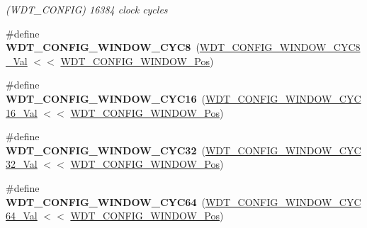 \begin{DoxyCompactItemize}
\begin{DoxyCompactList}\small\item\em (W\+D\+T\+\_\+\+C\+O\+N\+F\+I\+G) 16384 clock cycles \end{DoxyCompactList}\item 
\hypertarget{group___s_a_m_l21___w_d_t_ga017c5c86caead59c9eaa42c32219d348}{}\#define {\bfseries W\+D\+T\+\_\+\+C\+O\+N\+F\+I\+G\+\_\+\+W\+I\+N\+D\+O\+W\+\_\+\+C\+Y\+C8}~(\hyperlink{group___s_a_m_l21___w_d_t_ga6c3961932249ae130fcfba2c4a7eb4d5}{W\+D\+T\+\_\+\+C\+O\+N\+F\+I\+G\+\_\+\+W\+I\+N\+D\+O\+W\+\_\+\+C\+Y\+C8\+\_\+\+Val}    $<$$<$ \hyperlink{group___s_a_m_l21___w_d_t_gab2d3263bd9ad06e3257234d9da623ef8}{W\+D\+T\+\_\+\+C\+O\+N\+F\+I\+G\+\_\+\+W\+I\+N\+D\+O\+W\+\_\+\+Pos})\label{group___s_a_m_l21___w_d_t_ga017c5c86caead59c9eaa42c32219d348}

\item 
\hypertarget{group___s_a_m_l21___w_d_t_ga914e9688e4e761a07f9e692bea93bad5}{}\#define {\bfseries W\+D\+T\+\_\+\+C\+O\+N\+F\+I\+G\+\_\+\+W\+I\+N\+D\+O\+W\+\_\+\+C\+Y\+C16}~(\hyperlink{group___s_a_m_l21___w_d_t_ga1c19b5a551e3cf9e57c3291657fcaa85}{W\+D\+T\+\_\+\+C\+O\+N\+F\+I\+G\+\_\+\+W\+I\+N\+D\+O\+W\+\_\+\+C\+Y\+C16\+\_\+\+Val}   $<$$<$ \hyperlink{group___s_a_m_l21___w_d_t_gab2d3263bd9ad06e3257234d9da623ef8}{W\+D\+T\+\_\+\+C\+O\+N\+F\+I\+G\+\_\+\+W\+I\+N\+D\+O\+W\+\_\+\+Pos})\label{group___s_a_m_l21___w_d_t_ga914e9688e4e761a07f9e692bea93bad5}

\item 
\hypertarget{group___s_a_m_l21___w_d_t_ga634c2266a0eac23c9995d2e587764868}{}\#define {\bfseries W\+D\+T\+\_\+\+C\+O\+N\+F\+I\+G\+\_\+\+W\+I\+N\+D\+O\+W\+\_\+\+C\+Y\+C32}~(\hyperlink{group___s_a_m_l21___w_d_t_ga42465a866ecbf65f33e452beb05cb8d0}{W\+D\+T\+\_\+\+C\+O\+N\+F\+I\+G\+\_\+\+W\+I\+N\+D\+O\+W\+\_\+\+C\+Y\+C32\+\_\+\+Val}   $<$$<$ \hyperlink{group___s_a_m_l21___w_d_t_gab2d3263bd9ad06e3257234d9da623ef8}{W\+D\+T\+\_\+\+C\+O\+N\+F\+I\+G\+\_\+\+W\+I\+N\+D\+O\+W\+\_\+\+Pos})\label{group___s_a_m_l21___w_d_t_ga634c2266a0eac23c9995d2e587764868}

\item 
\hypertarget{group___s_a_m_l21___w_d_t_ga2e9dee70e4f3bf9092a34fb481ffcd4d}{}\#define {\bfseries W\+D\+T\+\_\+\+C\+O\+N\+F\+I\+G\+\_\+\+W\+I\+N\+D\+O\+W\+\_\+\+C\+Y\+C64}~(\hyperlink{group___s_a_m_l21___w_d_t_gac49da38933b208ae93a8e042ab11b6e0}{W\+D\+T\+\_\+\+C\+O\+N\+F\+I\+G\+\_\+\+W\+I\+N\+D\+O\+W\+\_\+\+C\+Y\+C64\+\_\+\+Val}   $<$$<$ \hyperlink{group___s_a_m_l21___w_d_t_gab2d3263bd9ad06e3257234d9da623ef8}{W\+D\+T\+\_\+\+C\+O\+N\+F\+I\+G\+\_\+\+W\+I\+N\+D\+O\+W\+\_\+\+Pos})\label{group___s_a_m_l21___w_d_t_ga2e9dee70e4f3bf9092a34fb481ffcd4d}


\end{DoxyCompactItemize}
